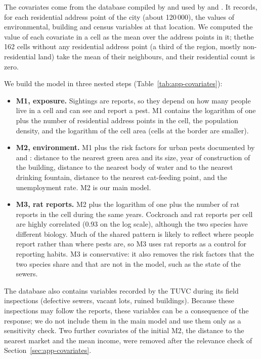 The covariates come from the database compiled by \citet{tamayo2013identificacion} and used by \citet{tamayo2014risk} and \citet{ayyad2018non}. It records, for each residential address point of the city (about 120\,000), the values of environmental, building and census variables at that location. We computed the value of each covariate in a cell as the mean over the address points in it; thethe 162 cells without any residential address point (a third of the region, mostly non-residential land) take the mean of their neighbours, and their residential count is zero.

We build the model in three nested steps (Table~\ref{tab:app-covariates}):
\begin{itemize}
  \item \textbf{M1, exposure.} Sightings are reports, so they depend on how many people live in a cell and can see and report a pest. M1 contains the logarithm of one plus the number of residential address points in the cell, the population density, and the logarithm of the cell area (cells at the border are smaller).
  \item \textbf{M2, environment.} M1 plus the risk factors for urban pests documented by \citet{tamayo2014risk} and \citet{ayyad2018non}: distance to the nearest green area and its size, year of construction of the building, distance to the nearest body of water and to the nearest drinking fountain, distance to the nearest cat-feeding point, and the unemployment rate. M2 is our main model.
  \item \textbf{M3, rat reports.} M2 plus the logarithm of one plus the number of rat reports in the cell during the same years. Cockroach and rat reports per cell are highly correlated (0.93 on the log scale), although the two species have different biology. Much of the shared pattern is likely to reflect where people report rather than where pests are, so M3 uses rat reports as a control for reporting habits. M3 is conservative: it also removes the risk factors that the two species share and that are not in the model, such as the state of the sewers.
\end{itemize}
The database also contains variables recorded by the TUVC during its field inspections (defective sewers, vacant lots, ruined buildings). Because these inspections may follow the reports, these variables can be a consequence of the response; we do not include them in the main model and use them only as a sensitivity check. Two further covariates of the initial M2, the distance to the nearest market and the mean income, were removed after the relevance check of Section~\ref{sec:app-covariates}.


